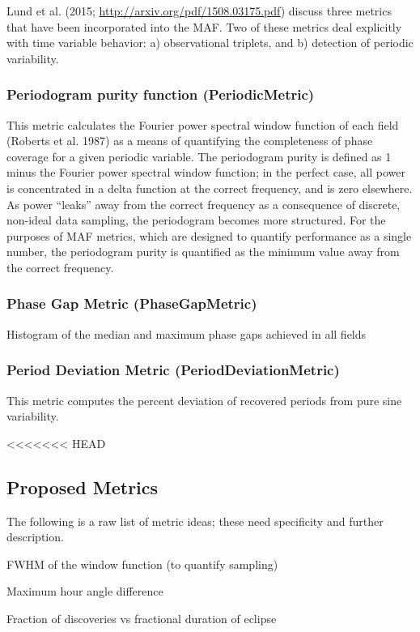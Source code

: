 Lund et al. (2015; \url{http://arxiv.org/pdf/1508.03175.pdf}) discuss three metrics that have been incorporated into the MAF. Two of these metrics deal explicitly with time variable behavior: a) observational triplets, and b) detection of periodic variability. 

\subsubsection{Periodogram purity function (PeriodicMetric)}
This metric calculates the Fourier power spectral window function of each field (Roberts et al. 1987) as a means of quantifying the completeness of phase coverage for a given periodic variable. The periodogram purity is defined as 1 minus the Fourier power spectral window function; in the perfect case, all power is concentrated in a delta function at the correct frequency, and is zero elsewhere. As power ``leaks'' away from the correct frequency as a consequence of discrete, non-ideal data sampling, the periodogram becomes more structured. For the purposes of MAF metrics, which are designed to quantify performance as a single number, the periodogram purity is quantified as the minimum value away from the correct frequency. 

\subsubsection{Phase Gap Metric (PhaseGapMetric)}
Histogram of the median and maximum phase gaps achieved in all fields

\subsubsection{Period Deviation Metric (PeriodDeviationMetric)}

This metric computes the percent deviation of recovered periods from pure sine variability.

<<<<<<< HEAD
\subsection{Proposed Metrics}

The following is a raw list of metric ideas; these need specificity and further description. 

FWHM of the window function (to quantify sampling)

Maximum hour angle difference 

Fraction of discoveries vs fractional duration of eclipse

